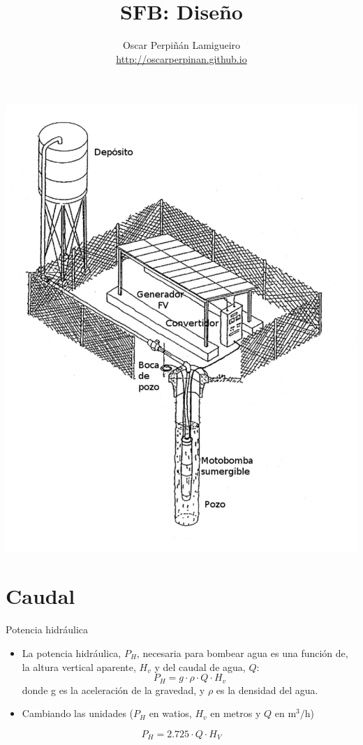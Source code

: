 \documentclass[xcolor={usenames,svgnames,dvipsnames}]{beamer}
\author{Oscar Perpiñán Lamigueiro \\ \url{http://oscarperpinan.github.io}}
\date{}
\title{SFB: Diseño}
\begin{document}
\maketitle

\begin{frame}[label=sec-0-1]{}
\begin{center}
\includegraphics[height=0.9\textheight]{../figs/EsquemaBombeo_oscar.pdf}
\end{center}
\end{frame}


\section{Caudal}
\label{sec-1}


\begin{frame}[label=sec-1-1]{Potencia hidráulica}
\begin{itemize}
\item La \alert{potencia hidráulica}, $P_{H}$, necesaria para bombear agua es una función de, la \alert{altura vertical aparente}, $H_{v}$ y del \alert{caudal de agua}, $Q$:$$P_{H}=g\cdot\rho\cdot Q\cdot H_{v}$$ donde g es la aceleración de la gravedad, y $\rho$ es la densidad del agua.

\item Cambiando las unidades ($P_{H}$ en watios, $H_{v}$ en metros y $Q$ en $\si{\meter\cubed\per\hour}$)
\end{itemize}
$$P_{H}=2.725\cdot Q\cdot H_{V}$$
\end{frame}
\end{document}
